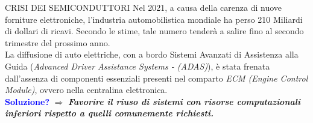 {

\begin{frame}{CRISI DEI SEMICONDUTTORI}
    \renewcommand{\thefootnote}{\fnsymbol{footnote}}
    Nel 2021, a causa della carenza di nuove forniture elettroniche, l'industria 
    automobilistica mondiale ha perso 210 Miliardi di dollari di ricavi\footnotemark[1].
    Secondo le stime, tale numero tenderà a salire fino al secondo trimestre 
    del prossimo anno.\\
    \vspace{0.3cm}
    La diffusione di auto elettriche, con a bordo Sistemi 
    Avanzati di Assistenza alla Guida (\emph{Advanced Driver Assistance Systems - 
    (ADAS)}), è stata frenata dall'assenza di componenti essenziali presenti nel comparto \emph{ECM (Engine Control Module)}, ovvero nella centralina elettronica.\\
    \vspace{0.3cm}
    \textcolor{blue}{{\bfseries{Soluzione?}}} $\Rightarrow$ {\bfseries{\emph{Favorire il riuso di sistemi con risorse computazionali inferiori rispetto a quelli comunemente richiesti.}}}
\end{frame}

}

